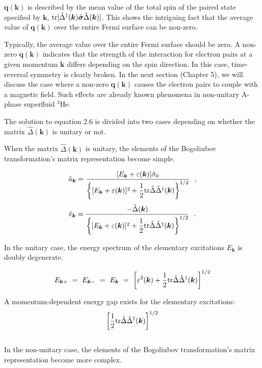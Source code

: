 \documentclass[uplatex,a4j,12pt,dvipdfmx]{jsarticle}
\begin{document}
$\bm{q}(\bm{k})$ is described by the mean value of the total spin of the paired state specified by $\bm{k}$, ${\rm tr}[\hat{\Delta}^{\dagger}(\bm{k}) \hat{\bm{\sigma}} \hat{\Delta}(\bm{k}) ]$.
This shows the intriguing fact that the average value of $\bm{q}(\bm{k})$ over the entire Fermi surface can be non-zero.

Typically, the average value over the entire Fermi surface should be zero.
A non-zero $\bm{q}(\bm{k})$ indicates that the strength of the interaction for electron pairs at a given momentum $\bm{k}$ differs depending on the spin direction.
In this case, time-reversal symmetry is clearly broken.
In the next section (Chapter 5), we will discuss the case where a non-zero $\bm{q}(\bm{k})$ causes the electron pairs to couple with a magnetic field.
Such effects are already known phenomena in non-unitary A-phase superfluid $^3$He.


The solution to equation 2.6 is divided into two cases depending on whether the matrix $\hat{\Delta}(\bm{k})$ is unitary or not.

When the matrix $\hat{\Delta}(\bm{k})$ is unitary, the elements of the Bogoliubov transformation's matrix representation become simple.

\[
	\hat{u}_{\bm{k}}
	=
	\dfrac{ [ E_{\bm{k}} + \varepsilon(\bm{k}) ] \hat{\sigma}_{0} }
	{ \left\{ [ E_{\bm{k}} + \varepsilon(\bm{k}) ]^{2} + \dfrac{1}{2} {\rm tr} \hat{\Delta} \hat{\Delta}^{\dagger}(\bm{k}) \right\}^{1/2} }
	\ \ ,
	\nonumber
\]\[
	\hat{v}_{\bm{k}}
	=
	\dfrac{ - \hat{\Delta}(\bm{k}) }
	{ \left\{ [ E_{\bm{k}} + \varepsilon(\bm{k}) ]^{2} + \dfrac{1}{2} {\rm tr} \hat{\Delta} \hat{\Delta}^{\dagger}(\bm{k}) \right\}^{1/2} }
	\ \ .
\]

In the unitary case, the energy spectrum of the elementary excitations $E_{\bm{k}}$ is doubly degenerate.

\[
	E_{\bm{k}+}
	\ = \
	E_{\bm{k}-}
	\ = \
	E_{\bm{k}}
	\ = \
	\left[ \varepsilon^{2}(\bm{k}) + \dfrac{1}{2} {\rm tr} \hat{\Delta} \hat{\Delta}^{\dagger}(\bm{k}) \right]^{1/2}
	\nonumber
\]

A momentum-dependent energy gap exists for the elementary excitations:
$$
	\left[ \dfrac{1}{2} {\rm tr} \hat{\Delta} \hat{\Delta}^{\dagger}(\bm{k}) \right]^{1/2}
$$

${}$

In the non-unitary case, the elements of the Bogoliubov transformation's matrix representation become more complex.
\end{document}
